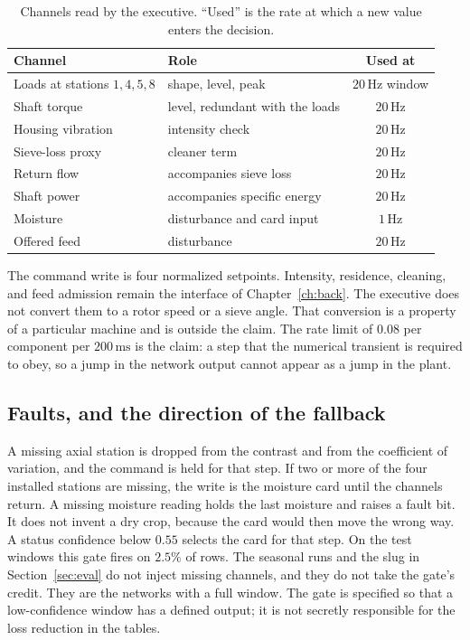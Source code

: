 \begin{table}[ht]
\centering
\caption{Channels read by the executive. ``Used'' is the rate at which a new value enters the decision.}
\label{tab:chan}
\begin{tabular}{@{}llc@{}}
\toprule
Channel & Role & Used at \\
\midrule
Loads at stations \(1,4,5,8\) & shape, level, peak & \(20\,\mathrm{Hz}\) window \\
Shaft torque & level, redundant with the loads & \(20\,\mathrm{Hz}\) \\
Housing vibration & intensity check & \(20\,\mathrm{Hz}\) \\
Sieve-loss proxy & cleaner term & \(20\,\mathrm{Hz}\) \\
Return flow & accompanies sieve loss & \(20\,\mathrm{Hz}\) \\
Shaft power & accompanies specific energy & \(20\,\mathrm{Hz}\) \\
Moisture & disturbance and card input & \(1\,\mathrm{Hz}\) \\
Offered feed & disturbance & \(20\,\mathrm{Hz}\) \\
\bottomrule
\end{tabular}
\end{table}

The command write is four normalized setpoints. Intensity, residence, cleaning, and feed admission remain the interface of Chapter~\ref{ch:back}. The executive does not convert them to a rotor speed or a sieve angle. That conversion is a property of a particular machine and is outside the claim. The rate limit of \(0.08\) per component per \(200\,\mathrm{ms}\) is the claim: a step that the numerical transient is required to obey, so a jump in the network output cannot appear as a jump in the plant.

\subsection{Faults, and the direction of the fallback}

A missing axial station is dropped from the contrast and from the coefficient of variation, and the command is held for that step. If two or more of the four installed stations are missing, the write is the moisture card until the channels return. A missing moisture reading holds the last moisture and raises a fault bit. It does not invent a dry crop, because the card would then move the wrong way. A status confidence below \(0.55\) selects the card for that step. On the test windows this gate fires on \(2.5\%\) of rows. The seasonal runs and the slug in Section~\ref{sec:eval} do not inject missing channels, and they do not take the gate's credit. They are the networks with a full window. The gate is specified so that a low-confidence window has a defined output; it is not secretly responsible for the loss reduction in the tables.

